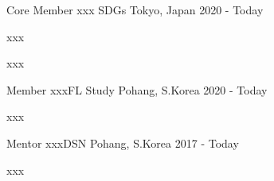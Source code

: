 

\begin{cventries}

  \cventry
    {Core Member} %
    {xxx SDGs} %
    {Tokyo, Japan} %
    {2020 - Today} %
    {
      \begin{cvitems} %
        \item {xxx}
        \item {xxx}
      \end{cvitems}
    }

\cventry
    {Member} %
    {xxxFL Study} %
    {Pohang, S.Korea} %
    {2020 - Today} %
    {
      \begin{cvitems} %
        \item {xxx}
      \end{cvitems}
    }


\cventry
    {Mentor} %
    {xxxDSN} %
    {Pohang, S.Korea} %
    {2017 - Today} %
    {
      \begin{cvitems} %
        \item {xxx}
      \end{cvitems}
    }

  
\end{cventries}
